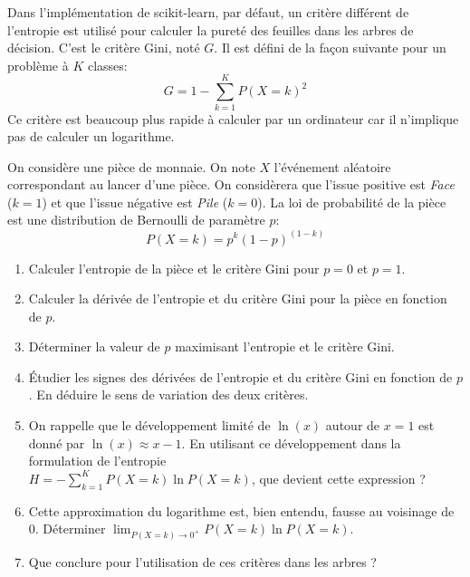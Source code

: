 \documentclass[solutions]{../exercices}
\begin{document}
	\begin{exercice}
		Dans l'implémentation de scikit-learn, par défaut, un critère différent de l'entropie est utilisé pour calculer la pureté des feuilles dans les arbres de décision. C'est le critère Gini, noté $G$. Il est défini de la façon suivante pour un problème à $K$ classes:
		\begin{equation*}
			G = 1 - \sum_{k=1}^K P(X=k)^2
		\end{equation*}
		Ce critère est beaucoup plus rapide à calculer par un ordinateur car il n'implique pas de calculer un logarithme.

		On considère une pièce de monnaie. On note $X$ l'événement aléatoire correspondant au lancer d'une pièce. On considèrera que l'issue positive est \textit{Face} ($k = 1$) et que l'issue négative est \textit{Pile} ($k = 0$). La loi de probabilité de la pièce est une distribution de Bernoulli de paramètre $p$:
		\begin{equation*}
			P(X = k) = p^k \left(1 - p\right)^{\left(1 - k\right)}
		\end{equation*}
		\begin{enumerate}
			\item Calculer l'entropie de la pièce et le critère Gini pour $p = 0$ et $p = 1$.
			\item Calculer la dérivée de l'entropie et du critère Gini pour la pièce en fonction de $p$.
			\item Déterminer la valeur de $p$ maximisant l'entropie et le critère Gini.
			\item \'Etudier les signes des dérivées de l'entropie et du critère Gini en fonction de $p$. En déduire le sens de variation des deux critères.
			\item On rappelle que le développement limité de $\ln(x)$ autour de $x=1$ est donné par $\ln(x) \approx x - 1$. En utilisant ce développement dans la formulation de l'entropie \\ \mbox{$H = - \sum_{k=1}^K P(X=k) \ln P(X=k)$}, que devient cette expression ?
			\item Cette approximation du logarithme est, bien entendu, fausse au voisinage de 0. Déterminer $\lim_{P(X=k) \to 0^+} P(X=k) \ln P(X=k)$.
			\item Que conclure pour l'utilisation de ces critères dans les arbres ?
		\end{enumerate}
	\end{exercice}
\end{document}
